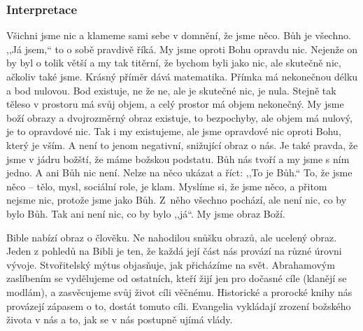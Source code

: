 \subsubsection*{Interpretace}

Všichni jsme nic a klameme sami sebe v domnění, že jsme něco. Bůh je všechno.
,,Já jsem,`` to o sobě pravdivě říká. My jsme oproti Bohu opravdu nic. Nejenže
on by byl o tolik větší a my tak titěrní, že bychom byli jako nic, ale skutečně
nic, ačkoliv také jsme. Krásný příměr dává matematika. Přímka má nekonečnou
délku a bod nulovou. Bod existuje, ne že ne, ale je skutečné nic, je nula.
Stejně tak těleso v prostoru má svůj objem, a celý prostor má objem nekonečný.
My jsme boží obrazy a dvojrozměrný obraz existuje, to bezpochyby, ale objem má
nulový, je to opravdové nic. Tak i my existujeme, ale jsme opravdové nic oproti
Bohu, který je vším. A není to jenom negativní, snižující obraz o nás. Je také
pravda, že jsme v jádru božští, že máme božskou podstatu. Bůh nás tvoří a my
jsme s ním jedno. A ani Bůh nic není. Nelze na něco ukázat a říct: ,,To je
Bůh.`` To, že jsme něco -- tělo, mysl, sociální role, je klam. Myslíme si, že
jsme něco, a přitom nejsme nic, protože jsme jako Bůh. Z~něho všechno pochází,
ale není nic, co by bylo Bůh. Tak ani není nic, co by bylo ,,já``. My jsme obraz
Boží.



Bible nabízí obraz o člověku. Ne nahodilou snůšku obrazů, ale ucelený obraz.
Jeden z pohledů na Bibli je ten, že každá její část nás provází na různé úrovni vývoje. Stvořitelský mýtus objasňuje, jak přicházíme na svět. Abrahamovým zaslíbením se vydělujeme od ostatních, kteří žijí jen pro dočasné cíle (klanějí se modlám), a zasvěcujeme svůj život cíli věčnému. Historické a prorocké knihy nás provázejí zápasem o to, dostát tomuto cíli. Evangelia vykládají zrození božského života v nás a to, jak se v nás postupně ujímá vlády.

